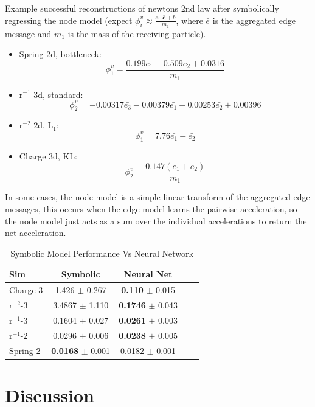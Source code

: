 \documentclass[11pt]{article}
\begin{document}
Example successful reconstructions of newtons 2nd law after symbolically regressing the node model
(expect $\phi^{v}_i \approx \frac{\mathbf{a} \cdot \mathbf{\bar{e}} + b}{m_1}$, where $\bar{e}$ is the aggregated edge message and $m_1$ is the mass of the receiving particle).
\begin{itemize}
        \item
        Spring 2d, bottleneck:
        $$
        \phi^{v}_1 = \frac{0.199\bar{e_1} - 0.509\bar{e_2} + 0.0316}{m_1}$$
        \item
        r$^{-1}$ 3d, standard:
        $$
        \phi^{v}_2 = -0.00317\bar{e_3} - 0.00379\bar{e_1} - 0.00253\bar{e_2} + 0.00396
        $$
        \item
        r$^{-2}$ 2d, L$_1$:
        $$
        \phi^{v}_1 = 7.76\bar{e_1} - \bar{e_2}
        $$
        \item
        Charge 3d, KL:
        $$
        \phi^{v}_2 = \frac{0.147(\bar{e_1} + \bar{e_2})}{m_1}
        $$
    \end{itemize}

    In some cases, the node model is a simple linear transform of the aggregated edge messages, this occurs when the edge model learns the pairwise acceleration, so the node model just acts as a sum over the individual accelerations to return the net acceleration. 
    \begin{table}[H]
        \centering
        \begin{tabular}{lcccc}
        \hline
        Sim & Symbolic & Neural Net \\
        \hline
        Charge-3 & 1.426 $\pm$ 0.267 & \textbf{0.110} $\pm$ 0.015 \\
        r$^{-2}$-3 & 3.4867 $\pm$ 1.110 & \textbf{0.1746} $\pm$ 0.043 \\
        r$^{-1}$-3 & 0.1604 $\pm$ 0.027 &\textbf{0.0261} $\pm$ 0.003 \\
        r$^{-1}$-2 & 0.0296 $\pm$ 0.006 & \textbf{0.0238} $\pm$ 0.005 \\
        Spring-2 & \textbf{0.0168} $\pm$ 0.001 & 0.0182 $\pm$ 0.001 \\
        \hline
        \end{tabular}
        \caption{Symbolic Model Performance Vs Neural Network}
        \label{tab:sr_vs_nn_table}
    \end{table}

    \section{Discussion}
\end{document}
